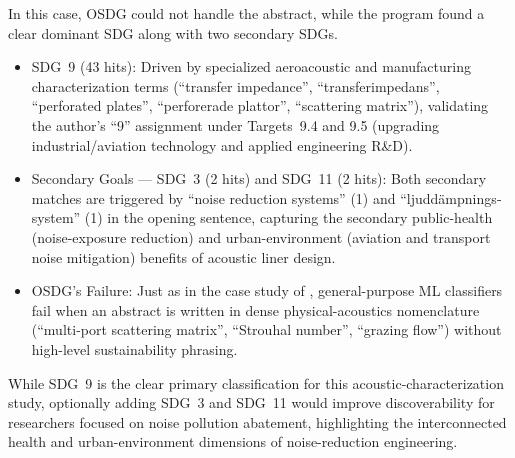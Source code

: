 \begin{casestudySection}
In this case, OSDG could not handle the abstract, while the program found a clear dominant \gls{SDG} along with two secondary \glspl{SDG}.


\begin{itemize}
    \item \gls{SDG}~9 (\num{43} hits): Driven by specialized aeroacoustic and manufacturing characterization terms (\enquote{transfer impedance}, \enquote{\foreignlanguage{swedish}{transferimpedans}}, \enquote{perforated plates}, \enquote{\foreignlanguage{swedish}{perforerade plattor}}, \enquote{scattering matrix}), validating the author's \enquote{9} assignment under Targets~9.4 and 9.5 (upgrading industrial/aviation technology and applied engineering R\&D).

    \item Secondary Goals --- \gls{SDG}~3 (\num{2} hits) and \gls{SDG}~11 (\num{2} hits): Both secondary matches are triggered by \enquote{noise reduction systems} (\num{1}) and \enquote{\foreignlanguage{swedish}{ljuddämpningssystem}} (\num{1}) in the opening sentence, capturing the secondary public-health (noise-exposure reduction) and urban-environment (aviation and transport noise mitigation) benefits of acoustic liner design.

    \item OSDG's Failure: Just as in the case study of , general-purpose \gls{ML} classifiers fail when an abstract is written in dense physical-acoustics nomenclature (\enquote{multi-port scattering matrix}, \enquote{Strouhal number}, \enquote{grazing flow}) without high-level sustainability phrasing.
\end{itemize}
\end{casestudySection}

\begin{takeaway}
While \gls{SDG}~9 is the clear primary classification for this acoustic-characterization study, optionally adding \gls{SDG}~3 and \gls{SDG}~11 would improve discoverability for researchers focused on noise pollution abatement, highlighting the interconnected health and urban-environment dimensions of noise-reduction engineering.
\end{takeaway}

